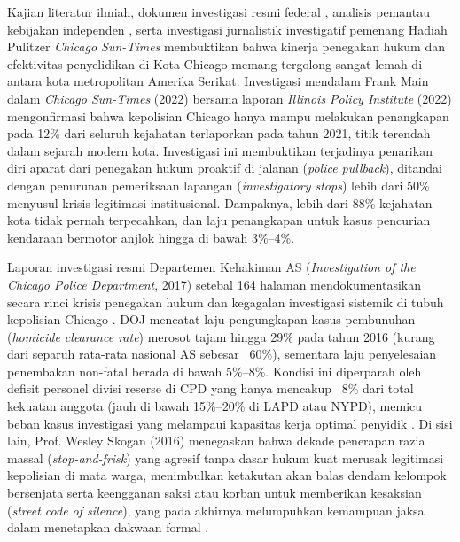 \documentclass[11pt,a4paper]{article}
\begin{document}
Kajian literatur ilmiah, dokumen investigasi resmi federal \cite{doj2017, skogan2016}, analisis pemantau kebijakan independen \cite{ipi2022}, serta investigasi jurnalistik investigatif pemenang Hadiah Pulitzer \textit{Chicago Sun-Times} \cite{main2022} membuktikan bahwa kinerja penegakan hukum dan efektivitas penyelidikan di Kota Chicago memang tergolong sangat lemah di antara kota metropolitan Amerika Serikat. Investigasi mendalam Frank Main dalam \textit{Chicago Sun-Times} (2022) bersama laporan \textit{Illinois Policy Institute} (2022) mengonfirmasi bahwa kepolisian Chicago hanya mampu melakukan penangkapan pada 12\% dari seluruh kejahatan terlaporkan pada tahun 2021, titik terendah dalam sejarah modern kota. Investigasi ini membuktikan terjadinya penarikan diri aparat dari penegakan hukum proaktif di jalanan (\textit{police pullback}), ditandai dengan penurunan pemeriksaan lapangan (\textit{investigatory stops}) lebih dari 50\% menyusul krisis legitimasi institusional. Dampaknya, lebih dari 88\% kejahatan kota tidak pernah terpecahkan, dan laju penangkapan untuk kasus pencurian kendaraan bermotor anjlok hingga di bawah 3\%--4\%.

Laporan investigasi resmi Departemen Kehakiman AS (\textit{Investigation of the Chicago Police Department}, 2017) setebal 164 halaman mendokumentasikan secara rinci krisis penegakan hukum dan kegagalan investigasi sistemik di tubuh kepolisian Chicago \cite{doj2017}. DOJ mencatat laju pengungkapan kasus pembunuhan (\textit{homicide clearance rate}) merosot tajam hingga 29\% pada tahun 2016 (kurang dari separuh rata-rata nasional AS sebesar ~60\%), sementara laju penyelesaian penembakan non-fatal berada di bawah 5\%--8\%. Kondisi ini diperparah oleh defisit personel divisi reserse di CPD yang hanya mencakup ~8\% dari total kekuatan anggota (jauh di bawah 15\%--20\% di LAPD atau NYPD), memicu beban kasus investigasi yang melampaui kapasitas kerja optimal penyidik \cite{doj2017}. Di sisi lain, Prof. Wesley Skogan (2016) menegaskan bahwa dekade penerapan razia massal (\textit{stop-and-frisk}) yang agresif tanpa dasar hukum kuat merusak legitimasi kepolisian di mata warga, menimbulkan ketakutan akan balas dendam kelompok bersenjata serta keengganan saksi atau korban untuk memberikan kesaksian (\textit{street code of silence}), yang pada akhirnya melumpuhkan kemampuan jaksa dalam menetapkan dakwaan formal \cite{skogan2016}.
\end{document}

